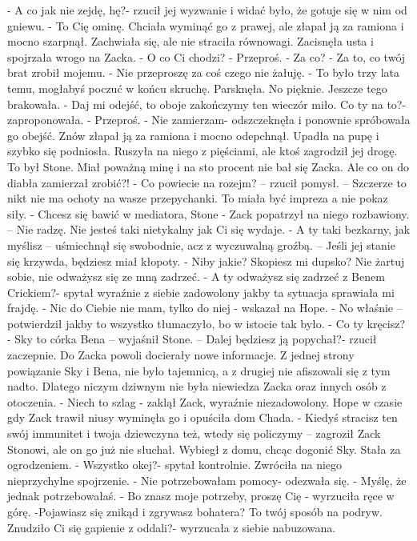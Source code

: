 \documentclass[12pt,a4paper]{book}
\begin{document}
- A co jak nie zejdę, hę?- rzucił jej wyzwanie i widać było, że gotuje się w nim od gniewu. 
- To Cię ominę.
Chciała wyminąć go z prawej, ale złapał ją za ramiona i mocno szarpnął. Zachwiała się, ale nie straciła równowagi. Zacisnęła usta i spojrzała wrogo na Zacka. 
- O co Ci chodzi? 
- Przeproś. 
- Za co?
- Za to, co twój brat zrobił mojemu.
- Nie przeproszę za coś czego nie żałuję. 
- To było trzy lata temu, mogłabyś poczuć w końcu skruchę. 
Parsknęła. No pięknie. Jeszcze tego brakowała. 
- Daj mi odejść, to oboje zakończymy ten wieczór miło. Co ty na to?- zaproponowała. 
- Przeproś.
- Nie zamierzam- odszczeknęła i ponownie spróbowała go obejść. 
Znów złapał ją za ramiona i mocno odepchnął. Upadła na pupę i szybko się podniosła. Ruszyła na niego z pięściami, ale ktoś zagrodził jej drogę. To był Stone. Miał poważną minę i na sto procent nie bał się Zacka. Ale co on do diabła zamierzał zrobić?!
- Co powiecie na rozejm? – rzucił pomysł. – Szczerze to nikt nie ma ochoty na wasze przepychanki. To miała być impreza a nie pokaz siły. 
- Chcesz się bawić w mediatora, Stone - Zack popatrzył na niego rozbawiony.  – Nie radzę. Nie jesteś taki nietykalny jak Ci się wydaje. 
- A ty taki bezkarny, jak myślisz – uśmiechnął się swobodnie, acz z wyczuwalną groźbą. – Jeśli jej stanie się krzywda, będziesz miał kłopoty. 
- Niby jakie? Skopiesz mi dupsko? Nie żartuj sobie, nie odważysz się ze mną zadrzeć.
- A ty odważysz się zadrzeć z Benem Crickiem?- spytał wyraźnie z siebie zadowolony jakby ta sytuacja sprawiała mi frajdę.
- Nic do Ciebie nie mam, tylko do niej - wskazał na Hope. 
- No właśnie – potwierdził jakby to wszystko tłumaczyło, bo w istocie tak było.
- Co ty kręcisz?
- Sky to córka Bena – wyjaśnił Stone. – Dalej będziesz ją popychał?- rzucił zaczepnie. 
Do Zacka powoli docierały nowe informacje. Z jednej strony powiązanie Sky i Bena, nie było tajemnicą, a z drugiej nie afiszowali się z tym nadto. Dlatego niczym dziwnym nie była niewiedza Zacka oraz innych osób z otoczenia. 
- Niech to szlag - zaklął Zack, wyraźnie niezadowolony. 
Hope w czasie gdy Zack trawił niusy wyminęła go i opuściła dom Chada. 
- Kiedyś stracisz ten swój immunitet i twoja dziewczyna też, wtedy się policzymy – zagroził Zack Stonowi, ale on go już nie słuchał. 
Wybiegł z domu, chcąc dogonić Sky. Stała za ogrodzeniem. 
- Wszystko okej?- spytał kontrolnie. 
Zwróciła na niego nieprzychylne spojrzenie. 
- Nie potrzebowałam pomocy- odezwała się.
- Myślę, że jednak potrzebowałaś. 
- Bo znasz moje potrzeby, proszę Cię - wyrzuciła ręce w górę. -Pojawiasz się znikąd i zgrywasz bohatera? To twój sposób na podryw. Znudziło Ci się gapienie z oddali?- wyrzucała z siebie nabuzowana.
\end{document}

